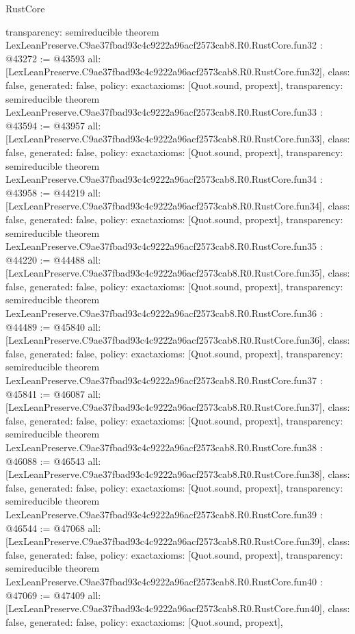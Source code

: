 \begin{lexlean}{RustCore}
\begin{coremodule}
{  transparency: semireducible
}
theorem LexLeanPreserve.C9ae37fbad93c4c9222a96acf2573cab8.R0.RustCore.fun32 : @43272 := @43593 {
  all: [LexLeanPreserve.C9ae37fbad93c4c9222a96acf2573cab8.R0.RustCore.fun32],
  class: false,
  generated: false,
  policy: exact{axioms: [Quot.sound, propext]},
  transparency: semireducible
}
theorem LexLeanPreserve.C9ae37fbad93c4c9222a96acf2573cab8.R0.RustCore.fun33 : @43594 := @43957 {
  all: [LexLeanPreserve.C9ae37fbad93c4c9222a96acf2573cab8.R0.RustCore.fun33],
  class: false,
  generated: false,
  policy: exact{axioms: [Quot.sound, propext]},
  transparency: semireducible
}
theorem LexLeanPreserve.C9ae37fbad93c4c9222a96acf2573cab8.R0.RustCore.fun34 : @43958 := @44219 {
  all: [LexLeanPreserve.C9ae37fbad93c4c9222a96acf2573cab8.R0.RustCore.fun34],
  class: false,
  generated: false,
  policy: exact{axioms: [Quot.sound, propext]},
  transparency: semireducible
}
theorem LexLeanPreserve.C9ae37fbad93c4c9222a96acf2573cab8.R0.RustCore.fun35 : @44220 := @44488 {
  all: [LexLeanPreserve.C9ae37fbad93c4c9222a96acf2573cab8.R0.RustCore.fun35],
  class: false,
  generated: false,
  policy: exact{axioms: [Quot.sound, propext]},
  transparency: semireducible
}
theorem LexLeanPreserve.C9ae37fbad93c4c9222a96acf2573cab8.R0.RustCore.fun36 : @44489 := @45840 {
  all: [LexLeanPreserve.C9ae37fbad93c4c9222a96acf2573cab8.R0.RustCore.fun36],
  class: false,
  generated: false,
  policy: exact{axioms: [Quot.sound, propext]},
  transparency: semireducible
}
theorem LexLeanPreserve.C9ae37fbad93c4c9222a96acf2573cab8.R0.RustCore.fun37 : @45841 := @46087 {
  all: [LexLeanPreserve.C9ae37fbad93c4c9222a96acf2573cab8.R0.RustCore.fun37],
  class: false,
  generated: false,
  policy: exact{axioms: [Quot.sound, propext]},
  transparency: semireducible
}
theorem LexLeanPreserve.C9ae37fbad93c4c9222a96acf2573cab8.R0.RustCore.fun38 : @46088 := @46543 {
  all: [LexLeanPreserve.C9ae37fbad93c4c9222a96acf2573cab8.R0.RustCore.fun38],
  class: false,
  generated: false,
  policy: exact{axioms: [Quot.sound, propext]},
  transparency: semireducible
}
theorem LexLeanPreserve.C9ae37fbad93c4c9222a96acf2573cab8.R0.RustCore.fun39 : @46544 := @47068 {
  all: [LexLeanPreserve.C9ae37fbad93c4c9222a96acf2573cab8.R0.RustCore.fun39],
  class: false,
  generated: false,
  policy: exact{axioms: [Quot.sound, propext]},
  transparency: semireducible
}
theorem LexLeanPreserve.C9ae37fbad93c4c9222a96acf2573cab8.R0.RustCore.fun40 : @47069 := @47409 {
  all: [LexLeanPreserve.C9ae37fbad93c4c9222a96acf2573cab8.R0.RustCore.fun40],
  class: false,
  generated: false,
  policy: exact{axioms: [Quot.sound, propext]},
}
\end{coremodule}
\end{lexlean}
